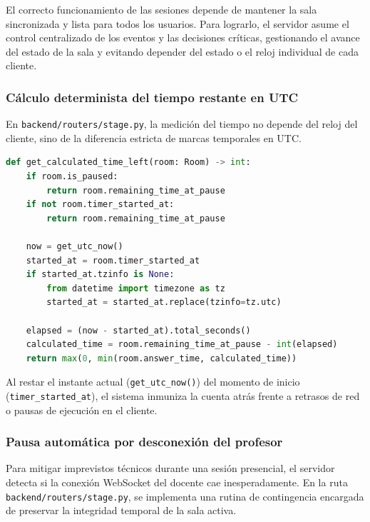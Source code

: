El correcto funcionamiento de las sesiones depende de mantener la sala sincronizada y lista para todos los usuarios. Para lograrlo, el servidor asume el control centralizado de los eventos y las decisiones críticas, gestionando el avance del estado de la sala y evitando depender del estado o el reloj individual de cada cliente.

\subsubsection{Cálculo determinista del tiempo restante en UTC}
En \texttt{backend/routers/stage.py}, la medición del tiempo no depende del reloj del cliente, sino de la diferencia estricta de marcas temporales en UTC.

\begin{lstlisting}[style=sourcecode, language=Python, captionpos=b, caption={Cálculo del tiempo restante sincronizado en el \textit{backend}.}, label={lst:calculo_tiempo_restante}]
def get_calculated_time_left(room: Room) -> int:
    if room.is_paused:
        return room.remaining_time_at_pause
    if not room.timer_started_at:
        return room.remaining_time_at_pause

    now = get_utc_now()
    started_at = room.timer_started_at
    if started_at.tzinfo is None:
        from datetime import timezone as tz
        started_at = started_at.replace(tzinfo=tz.utc)

    elapsed = (now - started_at).total_seconds()
    calculated_time = room.remaining_time_at_pause - int(elapsed)
    return max(0, min(room.answer_time, calculated_time))
\end{lstlisting}

Al restar el instante actual (\texttt{get\_utc\_now()}) del momento de inicio (\texttt{timer\_started\_at}), el sistema inmuniza la cuenta atrás frente a retrasos de red o pausas de ejecución en el cliente.

\subsubsection{Pausa automática por desconexión del profesor}
Para mitigar imprevistos técnicos durante una sesión presencial, el servidor detecta si la conexión WebSocket del docente cae inesperadamente. En la ruta \texttt{backend/routers/stage.py}, se implementa una rutina de contingencia encargada de preservar la integridad temporal de la sala activa.

